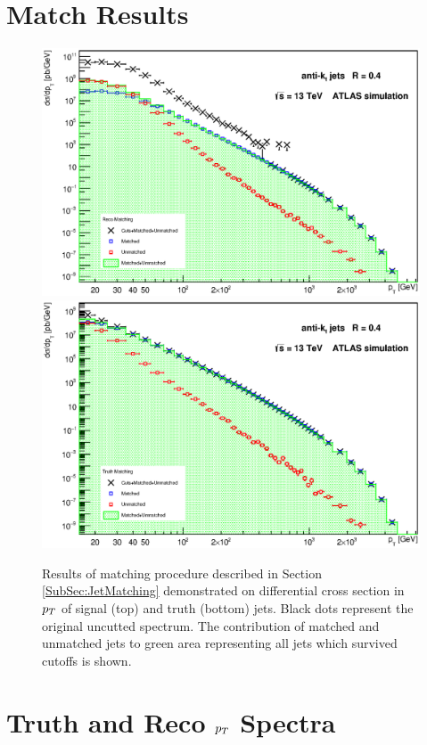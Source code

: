 \begin{appendices}
\section{Match Results}
\label{sed:MatchResults}

\begin{figure}[H]
  \centering
  \includegraphics[width=\textwidth]{Chapter3/SignalMatching.eps}
  \includegraphics[width=\textwidth]{Chapter3/TruthMatching.eps}
  \caption{Results of matching procedure described in Section
  \ref{SubSec:JetMatching} demonstrated on differential cross section in $p_{T}$ of
  signal (top) and truth (bottom) jets. Black dots represent the original
  uncutted spectrum. The contribution of matched and unmatched jets to
  green area representing all jets which survived cutoffs is shown.}
  \label{fig:Matching}
\end{figure}

\section{Truth and Reco $p_{T}$ Spectra}
\label{sec:TruthAndRecoSpectra}


\end{appendices}
